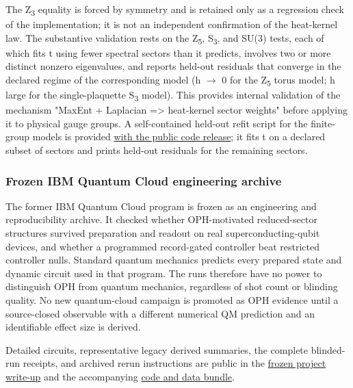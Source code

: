 The Z\textsubscript{3} equality is forced by symmetry and is retained only as a regression check of the implementation; it is not an independent confirmation of the heat-kernel law. The substantive validation rests on the Z\textsubscript{5}, S\textsubscript{3}, and SU(3) tests, each of which fits t using fewer spectral sectors than it predicts, involves two or more distinct nonzero eigenvalues, and reports held-out residuals that converge in the declared regime of the corresponding model (h \ensuremath{\to} 0 for the Z\textsubscript{5} torus model; h large for the single-plaquette S\textsubscript{3} model). This provides internal validation of the mechanism "MaxEnt + Laplacian =\textgreater{} heat-kernel sector weights" before applying it to physical gauge groups. A self-contained held-out refit script for the finite-group models is provided \href{https://github.com/FloatingPragma/observer-patch-holography/blob/main/code/edge_sectors/heat_kernel_holdout_validation.py}{with the public code release}; it fits t on a declared subset of sectors and prints held-out residuals for the remaining sectors.

\subsubsection{Frozen IBM Quantum Cloud engineering archive}\label{614a-ibm-quantum-cloud-hardware-benchmarks}

The former IBM Quantum Cloud program is frozen as an engineering and reproducibility archive. It checked whether OPH-motivated reduced-sector structures survived preparation and readout on real superconducting-qubit devices, and whether a programmed record-gated controller beat restricted controller nulls. Standard quantum mechanics predicts every prepared state and dynamic circuit used in that program. The runs therefore have no power to distinguish OPH from quantum mechanics, regardless of shot count or blinding quality. No new quantum-cloud campaign is promoted as OPH evidence until a source-closed observable with a different numerical QM prediction and an identifiable effect size is derived.

Detailed circuits, representative legacy derived summaries, the complete blinded-run receipts, and archived rerun instructions are public in the \href{https://github.com/FloatingPragma/observer-patch-holography/blob/main/docs/IBM_QUANTUM_CLOUD.md}{frozen project write-up} and the accompanying \href{https://github.com/FloatingPragma/observer-patch-holography/tree/main/code/ibm_quantum_cloud}{code and data bundle}.

